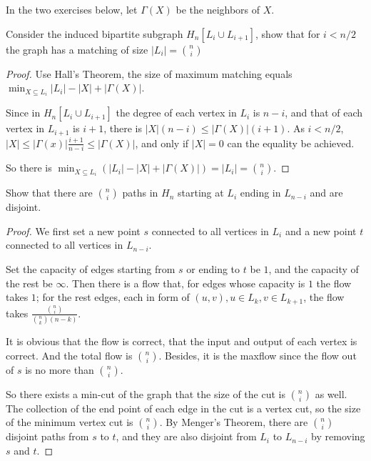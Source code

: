 


    \maketitle

    In the two exercises below, let $\Gamma(X)$ be the neighbors of $X$. 
    \begin{thm}{}{}
        Consider the induced bipartite subgraph $H_n[L_i\cup L_{i+1}]$, show that for $i<n/2$ the graph has a matching of size $|L_i|=\binom{n}{i}$
    \end{thm}
    \begin{proof}
        Use Hall's Theorem, the size of maximum matching equals $\min_{X\subseteq L_i}|L_i|-|X|+|\Gamma(X)|$. 

        Since in $H_n[L_i\cup L_{i+1}]$ the degree of each vertex in $L_i$ is $n-i$, 
        and that of each vertex in $L_{i+1}$ is $i+1$, there is $|X|(n-i)\leq|\Gamma(X)|(i+1)$. 
        As $i<n/2$, $|X|\leq|\Gamma(x)|\frac{i+1}{n-i}\leq|\Gamma(X)|$, and only if $|X|=0$ can the equality be achieved. 

        So there is $\min_{X\subseteq L_i}(|L_i|-|X|+|\Gamma(X)|)=|L_i|=\binom{n}{i}$. 
    \end{proof} 

    \begin{thm}{}{}
        Show that there are $\binom{n}{i}$ paths in $H_n$ starting at $L_i$ ending in $L_{n-i}$ and are disjoint. 
    \end{thm}
    \begin{proof}
        We first set a new point $s$ connected to all vertices in $L_i$ and a new point $t$ connected to all vertices in $L_{n-i}$. 
        
        Set the capacity of edges starting from $s$ or ending to $t$ be $1$, and the capacity of the rest be $\infty$. 
        Then there is a flow that, for edges whose capacity is $1$ the flow takes $1$; for the rest edges, 
        each in form of $(u,v), u\in L_k,v\in L_{k+1}$, the flow takes $\frac{\binom{n}{i}}{\binom{n}{k}(n-k)}$. 

        It is obvious that the flow is correct, that the input and output of each vertex is correct. And the total flow is $\binom{n}{i}$. 
        Besides, it is the maxflow since the flow out of $s$ is no more than $\binom{n}{i}$. 

        So there exists a min-cut of the graph that the size of the cut is $\binom{n}{i}$ as well. 
        The collection of the end point of each edge in the cut is a vertex cut, 
        so the size of the minimum vertex cut is $\binom{n}{i}$. By Menger's Theorem, 
        there are $\binom{n}{i}$ disjoint paths from $s$ to $t$, and they are also disjoint from $L_i$ to $L_{n-i}$ by removing $s$ and $t$. 
        
    \end{proof} 



